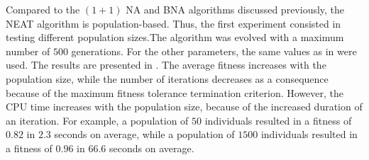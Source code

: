 Compared to the $(1 + 1)$ NA and BNA algorithms discussed previously, the NEAT algorithm is population-based.
Thus, the first experiment consisted in testing different population sizes.The algorithm was evolved with a maximum number of $500$ generations. For the other parameters, the same values as in \cite{neat} were used.
The results are presented in . The average fitness increases with the population size, while the number of iterations decreases as a consequence because of the maximum fitness tolerance termination
criterion. However, the CPU time increases with the population size, because of the increased duration of an iteration. For example, a population of $50$ individuals resulted in a fitness of $0.82$ in $2.3$ seconds
on average, while a population of $1500$ individuals resulted in a fitness of $0.96$ in $66.6$ seconds on average.

